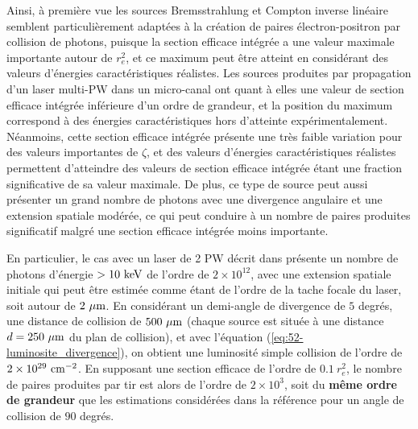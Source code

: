 \begin{refsection}
Ainsi, à première vue les sources Bremsstrahlung et Compton inverse linéaire semblent particulièrement adaptées à la création de paires électron-positron par collision de photons, puisque la section efficace intégrée a une valeur maximale importante autour de $r_e^2$, et ce maximum peut être atteint en considérant des valeurs d'énergies caractéristiques réalistes. Les sources produites par propagation d'un laser multi-PW dans un micro-canal ont quant à elles une valeur de section efficace intégrée inférieure d'un ordre de grandeur, et la position du maximum correspond à des énergies caractéristiques hors d'atteinte expérimentalement. Néanmoins, cette section efficace intégrée présente une très faible variation pour des valeurs importantes de $\zeta$, et des valeurs d'énergies caractéristiques réalistes permettent d'atteindre des valeurs de section efficace intégrée étant une fraction significative de sa valeur maximale. De plus, ce type de source peut aussi présenter un grand nombre de photons avec une divergence angulaire et une extension spatiale modérée, ce qui peut conduire à un nombre de paires produites significatif malgré une section efficace intégrée moins importante.

En particulier, le cas avec un laser de 2 PW décrit dans \cite{wang_2020} présente un nombre de photons d'énergie $>10 ~ \rm keV$ de l'ordre de $2 \times 10^{12}$, avec une extension spatiale initiale qui peut être estimée comme étant de l'ordre de la tache focale du laser, soit autour de $2 ~ \rm \mu m$. En considérant un demi-angle de divergence de $5$ degrés, une distance de collision de $500 ~ \rm \mu m$ (chaque source est située à une distance $d=250 ~ \rm \mu m$ du plan de collision), et avec l'équation (\ref{eq:52-luminosite_divergence}), on obtient une luminosité simple collision de l'ordre de $2 \times 10^{29} ~ \rm cm^{-2}$. En supposant une section efficace de l'ordre de $0.1 ~ r_e^2$, le nombre de paires produites par tir est alors de l'ordre de $2\times 10^3$, soit du \textbf{même ordre de grandeur} que les estimations considérées dans la référence \parencite{wang_2020} pour un angle de collision de $90$ degrés.


\end{refsection}

